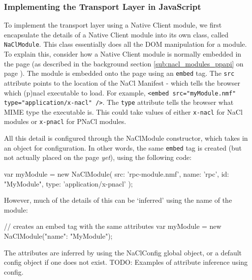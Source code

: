 \subsubsection{Implementing the Transport Layer in JavaScript} %
\label{ssub:implementing_the_transport_layer_in_javascript}
To implement the transport layer using a Native Client module, we first encapsulate the details of a Native Client module into its own class, called \lstinline{NaClModule}. This class essentially does all the DOM manipulation for a module. To explain this, consider how a Native Client module is normally embedded in the page (as described in the background section \ref{sub:nacl_modules_ppapi} on page \pageref{sub:nacl_modules_ppapi}). The module is embedded onto the page using an \lstinline{embed} tag. The \lstinline{src} attribute points to the location of the NaCl Manifest - which tells the browser which (p)nacl executable to load. For example, \lstinline{<embed src="myModule.nmf" type="application/x-nacl" />}. The \lstinline{type} attribute tells the browser what MIME type the executable is. This could take values of either \lstinline{x-nacl} for NaCl modules or \lstinline{x-pnacl} for PNaCl modules. 

All this detail is configured through the NaClModule constructor, which takes in an object for configuration. In other words, the same \lstinline{embed} tag is created (but not actually placed on the page \emph{yet}), using the following code:

\begin{code}
var myModule = new NaClModule({
  src: 'rpc-module.nmf', 
  name: 'rpc', 
  id: "MyModule", 
  type: 'application/x-pnacl'
});
\end{code}

However, much of the details of this can be `inferred' using the name of the module:

\begin{code}
// creates an embed tag with the same attributes
var myModule = new NaClModule({"name": "MyModule"});
\end{code}

The attributes are inferred by using the NaClConfig global object, or a default config object if one does not exist. TODO: Examples of attribute inference using config.

